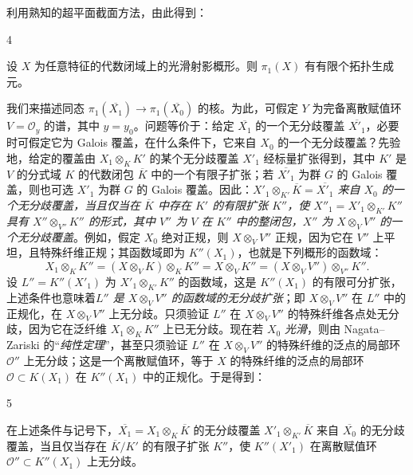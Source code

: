 \par{}利用熟知的超平面截面方法，由此得到：
\begin{corollary}{4}\label{fga2-theorem-12-corollary-4}\skipsinglepar
\par{}设 \(X\) 为任意特征的代数闭域上的光滑射影概形。则 \(\pi _1(X)\) 有有限个拓扑生成元。\end{corollary}
\par{}我们来描述同态 \(\pi _1(\overline {X_1})\to \pi _1(\overline {X_0})\) 的核。为此，可假定 \(Y\) 为完备离散赋值环 \(V=\mathcal {O}_y\) 的谱，其中 \(y=y_0\)。问题等价于：给定 \(\overline {X_1}\) 的一个无分歧覆盖 \(\overline {X'_1}\)，必要时可假定它为 Galois 覆盖，在什么条件下，它来自 \(X_0\) 的一个无分歧覆盖？先验地，给定的覆盖由 \(X_1\otimes _KK'\) 的某个无分歧覆盖 \(X'_1\) 经标量扩张得到，其中 \(K'\) 是 \(V\) 的分式域 \(K\) 的代数闭包 \(\overline {K}\) 中的一个有限子扩张；若 \(\overline {X'_1}\) 为群 \(G\) 的 Galois 覆盖，则也可选 \(X'_1\) 为群 \(G\) 的 Galois 覆盖。因此：\emph{\(X'_1\otimes _{K'}\overline {K}=\overline {X'_1}\) 来自 \(X_0\) 的一个无分歧覆盖，当且仅当在 \(\overline {K}\) 中存在 \(K'\) 的有限扩张 \(K''\)，使 \(X''_1=X'_1\otimes _{K'}K''\) 具有 \(X''\otimes _{V''}K''\) 的形式，其中 \(V''\) 为 \(V\) 在 \(K''\) 中的整闭包，\(X''\) 为 \(X\otimes _V V''\) 的一个无分歧覆盖}。例如，假定 \(X_0\) 绝对正规，则 \(X\otimes _V V''\) 正规，因为它在 \(V''\) 上平坦，且特殊纤维正规；其函数域即为 \(K''(X_1)\)，也就是下列概形的函数域：\[     X_1\otimes _K K''     = (X\otimes _VK)\otimes _KK''     = X\otimes _VK''     = (X\otimes _VV'')\otimes _{V''}K''.   \] 设 \(L''=K''(X'_1)\) 为 \(X'_1\otimes _{K'}K''\) 的函数域，这是 \(K''(X_1)\) 的有限可分扩张，上述条件也意味着\emph{\(L''\) 是 \(X\otimes _VV''\) 的函数域的无分歧扩张}；即 \(X\otimes _V V''\) 在 \(L''\) 中的正规化，在 \(X\otimes _VV''\) 上无分歧。只须验证 \(L''\) 在 \(X\otimes _VV''\) 的特殊纤维各点处无分歧，因为它在泛纤维 \(X_1\otimes _KK''\) 上已无分歧。现在若 \(X_0\) \emph{光滑}，则由 Nagata–Zariski 的“\emph{纯性定理}”，甚至只须验证 \(L''\) 在 \(X\otimes _VV''\) 的特殊纤维的泛点的局部环 \(\mathcal {O}''\) 上无分歧；这是一个离散赋值环，等于 \(X\) 的特殊纤维的泛点的局部环 \(\mathcal {O}\subset  K(X_1)\) 在 \(K''(X_1)\) 中的正规化。于是得到：
\begin{corollary}{5}\label{fga2-theorem-12-corollary-5}\skipsinglepar
\par{}在上述条件与记号下，\(\overline {X_1}=X_1\otimes _K\overline {K}\) 的无分歧覆盖 \(X'_1\otimes _{K'}\overline {K}\) 来自 \(\overline {X_0}\) 的无分歧覆盖，当且仅当存在 \(\overline {K}/K'\) 的有限子扩张 \(K''\)，使 \(K''(X'_1)\) 在离散赋值环 \(\mathcal {O}''\subset  K''(X_1)\) 上无分歧。\end{corollary}
